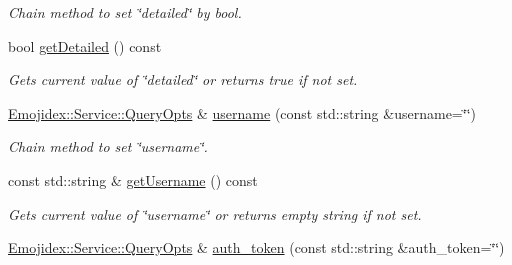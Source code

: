 \begin{DoxyCompactItemize}
\begin{DoxyCompactList}\small\item\em Chain method to set \char`\"{}detailed\char`\"{} by bool. \end{DoxyCompactList}\item 
bool \hyperlink{classEmojidex_1_1Service_1_1QueryOpts_ae48076b7bd5daa429ebea6f767e5304f}{get\+Detailed} () const 
\begin{DoxyCompactList}\small\item\em Gets current value of \char`\"{}detailed\char`\"{} or returns true if not set. \end{DoxyCompactList}\item 
\hyperlink{classEmojidex_1_1Service_1_1QueryOpts}{Emojidex\+::\+Service\+::\+Query\+Opts} \& \hyperlink{classEmojidex_1_1Service_1_1QueryOpts_ae4216a7709c4ecda00f5f347662f8f65}{username} (const std\+::string \&username=\char`\"{}\char`\"{})\hypertarget{classEmojidex_1_1Service_1_1QueryOpts_ae4216a7709c4ecda00f5f347662f8f65}{}\label{classEmojidex_1_1Service_1_1QueryOpts_ae4216a7709c4ecda00f5f347662f8f65}

\begin{DoxyCompactList}\small\item\em Chain method to set \char`\"{}username\char`\"{}. \end{DoxyCompactList}\item 
const std\+::string \& \hyperlink{classEmojidex_1_1Service_1_1QueryOpts_ad36b0b5169a96133f3f55db3322bf754}{get\+Username} () const 
\begin{DoxyCompactList}\small\item\em Gets current value of \char`\"{}username\char`\"{} or returns empty string if not set. \end{DoxyCompactList}\item 
\hyperlink{classEmojidex_1_1Service_1_1QueryOpts}{Emojidex\+::\+Service\+::\+Query\+Opts} \& \hyperlink{classEmojidex_1_1Service_1_1QueryOpts_acca0bdf9bffb60ac767cff0506bc0fcc}{auth\+\_\+token} (const std\+::string \&auth\+\_\+token=\char`\"{}\char`\"{})\hypertarget{classEmojidex_1_1Service_1_1QueryOpts_acca0bdf9bffb60ac767cff0506bc0fcc}{}\label{classEmojidex_1_1Service_1_1QueryOpts_acca0bdf9bffb60ac767cff0506bc0fcc}


\end{DoxyCompactItemize}
